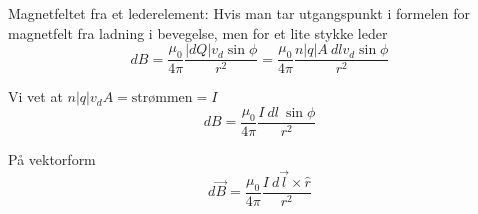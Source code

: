 Magnetfeltet fra et lederelement:
Hvis man tar utgangspunkt i formelen for magnetfelt fra ladning i bevegelse,
men for et lite stykke leder
$$dB = \frac{\mu_0}{4\pi} \frac{|dQ| v_d \sin{\phi}}{r^2}
     = \frac{\mu_0}{4\pi} \frac{n|q|A\ dl v_d \sin{\phi}}{r^2}$$

Vi vet at $n|q|v_dA = \text{strømmen} = I$
$$dB = \frac{\mu_0}{4\pi} \frac{I\ dl\ \sin{\phi}}{r^2}$$

På vektorform
$$d\vec{B} = \frac{\mu_0}{4\pi} \frac{I\ d\vec{l}\times\hat{r}}{r^2}$$
